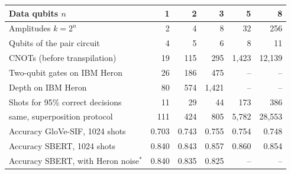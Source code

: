 \begin{tabular}{@{}lrrrrr@{}}
\toprule
Data qubits $n$ & 1 & 2 & 3 & 5 & 8 \\
\midrule
Amplitudes $k=2^n$ & 2 & 4 & 8 & 32 & 256 \\
Qubits of the pair circuit & 4 & 5 & 6 & 8 & 11 \\
CNOTs (before transpilation) & 19 & 115 & 295 & 1{,}423 & 12{,}139 \\
Two-qubit gates on IBM Heron & 26 & 186 & 475 & -- & -- \\
Depth on IBM Heron & 80 & 574 & 1{,}421 & -- & -- \\
Shots for 95\% correct decisions & 11 & 29 & 44 & 173 & 386 \\
\quad same, superposition protocol & 111 & 424 & 805 & 5{,}782 & 28{,}553 \\
Accuracy GloVe-SIF, 1024 shots & 0.703 & 0.743 & 0.755 & 0.754 & 0.748 \\
Accuracy SBERT, 1024 shots & 0.840 & 0.843 & 0.857 & 0.860 & 0.854 \\
Accuracy SBERT, with Heron noise$^*$ & 0.840 & 0.835 & 0.825 & -- & -- \\
\bottomrule
\end{tabular}